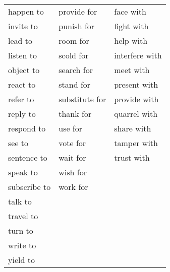 \begin{longtable}{| m{} | m{} | m{} |}
    happen to      & provide for    & face with      \\
    invite to      & punish for     & fight with     \\
    lead to        & room for       & help with      \\
    listen to      & scold for      & interfere with \\
    object to      & search for     & meet with      \\
    react to       & stand for      & present with   \\
    refer to       & substitute for & provide with   \\
    reply to       & thank for      & quarrel with   \\
    respond to     & use for        & share with     \\
    see to         & vote for       & tamper with    \\
    sentence to    & wait for       & trust with     \\
    speak to       & wish for       &                \\
    subscribe to   & work for       &                \\
    talk to        &                &                \\
    travel to      &                &                \\
    turn to        &                &                \\
    write to       &                &                \\
    yield to       &                &                \\
\end{longtable}
\bigskip


